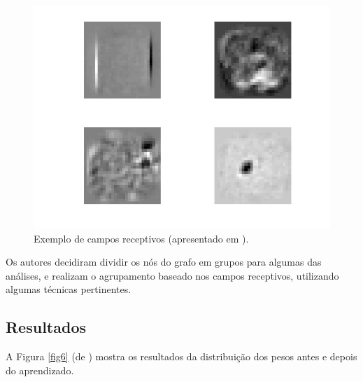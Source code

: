 \documentclass{article}
\begin{document}
            \begin{figure}[h!]
                \centering
                \includegraphics[scale=0.2]{Images/Receptive fields.png}
                \caption{Exemplo de campos receptivos (apresentado em \cite{testolin2018deep}).}
                \label{fig5}
            \end{figure}

            Os autores decidiram dividir os nós do grafo em grupos para algumas das análises, e realizam o agrupamento baseado nos campos receptivos, utilizando algumas técnicas pertinentes.

        \subsection{Resultados}

            A Figura \ref{fig6} (de \cite{testolin2018deep}) mostra os resultados da distribuição dos pesos antes e depois do aprendizado.
\end{document}
